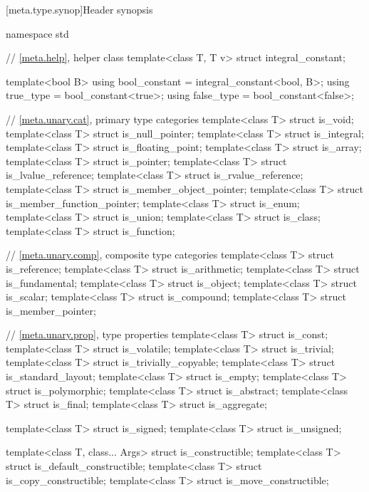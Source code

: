 [meta.type.synop]{Header  synopsis}

%
%
%
%
\begin{codeblock}
namespace std {
  // \ref{meta.help}, helper class
  template<class T, T v> struct integral_constant;

  template<bool B>
    using bool_constant = integral_constant<bool, B>;
  using true_type  = bool_constant<true>;
  using false_type = bool_constant<false>;

  // \ref{meta.unary.cat}, primary type categories
  template<class T> struct is_void;
  template<class T> struct is_null_pointer;
  template<class T> struct is_integral;
  template<class T> struct is_floating_point;
  template<class T> struct is_array;
  template<class T> struct is_pointer;
  template<class T> struct is_lvalue_reference;
  template<class T> struct is_rvalue_reference;
  template<class T> struct is_member_object_pointer;
  template<class T> struct is_member_function_pointer;
  template<class T> struct is_enum;
  template<class T> struct is_union;
  template<class T> struct is_class;
  template<class T> struct is_function;

  // \ref{meta.unary.comp}, composite type categories
  template<class T> struct is_reference;
  template<class T> struct is_arithmetic;
  template<class T> struct is_fundamental;
  template<class T> struct is_object;
  template<class T> struct is_scalar;
  template<class T> struct is_compound;
  template<class T> struct is_member_pointer;

  // \ref{meta.unary.prop}, type properties
  template<class T> struct is_const;
  template<class T> struct is_volatile;
  template<class T> struct is_trivial;
  template<class T> struct is_trivially_copyable;
  template<class T> struct is_standard_layout;
  template<class T> struct is_empty;
  template<class T> struct is_polymorphic;
  template<class T> struct is_abstract;
  template<class T> struct is_final;
  template<class T> struct is_aggregate;

  template<class T> struct is_signed;
  template<class T> struct is_unsigned;

  template<class T, class... Args> struct is_constructible;
  template<class T> struct is_default_constructible;
  template<class T> struct is_copy_constructible;
  template<class T> struct is_move_constructible;

}
\end{codeblock}
